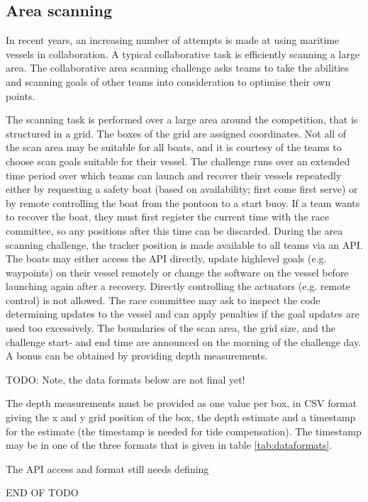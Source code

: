 \documentclass[12pt]{article}
\begin{document}
\subsection{Area scanning}
In recent years, an increasing number of attempts is made at using maritime
vessels in collaboration. A typical
collaborative task is efficiently scanning a large area.
The collaborative area scanning challenge asks teams to take the abilities and
scanning goals of other teams into consideration to optimise their own points.

The scanning task is performed over a large area around the competition, that is
structured in a grid. The boxes of the grid are assigned coordinates. Not all of
the scan area may be suitable for all boats, and it is courtesy of the teams to
choose scan goals suitable for their vessel. The
challenge runs over an extended time period over which teams can launch and
recover their vessels repeatedly either by requesting a safety boat (based on
availability; first come first serve) or by remote controlling the boat from the
pontoon to a start buoy. If a team wants to recover the boat, they must first
register the current time with the race committee, so any positions after this
time can be discarded.
During the area scanning challenge, the tracker position is made available 
to all teams via an API. The boats may either access the API directly, update
highlevel goals (e.g. waypoints) on their vessel remotely or change the software
on the vessel before launching again after a recovery. Directly controlling the
actuators (e.g. remote control) is not allowed. The race committee may ask to
inspect the code determining updates to the vessel and can apply penalties if
the goal updates are used too excessively.
The boundaries of the scan area, the grid size, and the challenge start- and end time
are announced on the morning of the challenge day.
A bonus can be obtained by providing depth measurements.

TODO: Note, the data formats below are not final yet!

The depth measurements
must be provided as one value per box, in CSV format giving the x and y grid
position of the box, the depth estimate and a timestamp for the estimate (the
timestamp is needed for tide compensation). The timestamp may be in one of the
three formats that is given in table \ref{tab:dataformats}. 

The API access and format still needs defining

END OF TODO
\end{document}
